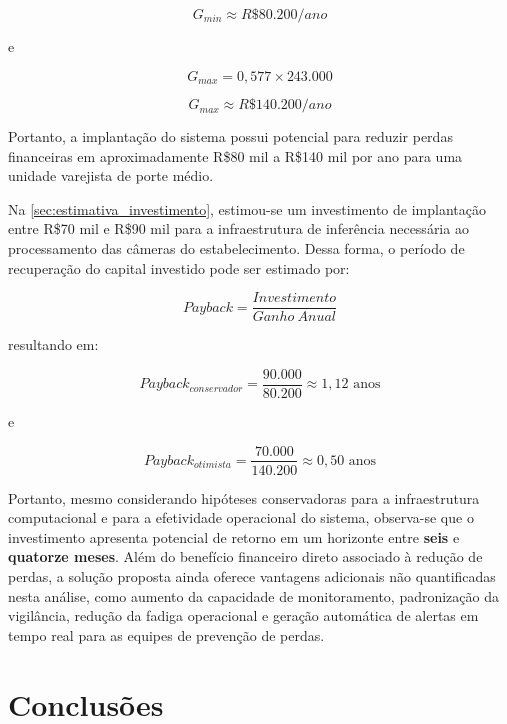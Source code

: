 \documentclass[12pt, %
openright, 
oneside, %
a4paper,    %
brazil]{facom-ufu-abntex2}
\begin{document}
\begin{equation}
G_{min}\approx R\$80.200/ano
\end{equation}

e

\begin{equation}
G_{max}=0,577 \times 243.000
\end{equation}

\begin{equation}
G_{max}\approx R\$140.200/ano
\end{equation}

Portanto, a implantação do sistema possui potencial para reduzir perdas financeiras em aproximadamente R\$80 mil a R\$140 mil por ano para uma unidade varejista de porte médio.

Na \autoref{sec:estimativa_investimento}, estimou-se um investimento de implantação entre R\$70 mil e R\$90 mil para a infraestrutura de inferência necessária ao processamento das câmeras do estabelecimento. Dessa forma, o período de recuperação do capital investido pode ser estimado por:

\begin{equation}
Payback=
\frac{Investimento}
{Ganho\ Anual}
\end{equation}

resultando em:

\begin{equation}
Payback_{conservador}
=
\frac{90.000}{80.200}
\approx 1,12 \text{ anos}
\end{equation}

e

\begin{equation}
Payback_{otimista}
=
\frac{70.000}{140.200}
\approx 0,50 \text{ anos}
\end{equation}

Portanto, mesmo considerando hipóteses conservadoras para a infraestrutura computacional e para a efetividade operacional do sistema, observa-se que o investimento apresenta potencial de retorno em um horizonte entre \textbf{seis} e \textbf{quatorze meses}. Além do benefício financeiro direto associado à redução de perdas, a solução proposta ainda oferece vantagens adicionais não quantificadas nesta análise, como aumento da capacidade de monitoramento, padronização da vigilância, redução da fadiga operacional e geração automática de alertas em tempo real para as equipes de prevenção de perdas.

\chapter[Conclusões]{Conclusões}
\end{document}
